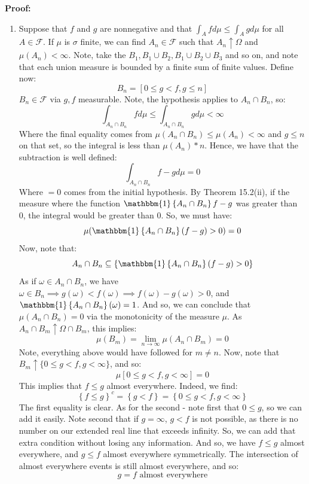 \documentclass[12pt,a4paper]{article}
\newcommand{\1}[1]{\mathbbm{1}\left\{ #1 \right\}}
\newcommand{\fcal}{\mathcal{F}}
\begin{document}
\textbf{Proof:} \begin{enumerate}
	\item Suppose that $f$ and $g$ are nonnegative and that $\int_A f d\mu \leq \int_A g d\mu$ for all $A \in \fcal$. If $\mu$ is $\sigma$ finite, we can find $A_n \in \fcal$ such that $A_n \uparrow \Omega$ and $\mu(A_n) < \infty$. Note, take the $B_1, B_1 \cup B_2, B_1 \cup B_2 \cup B_3$ and so on, and note that each union measure is bounded by a finite sum of finite values. Define now:
	$$
		B_n = \left[0 \leq g < f, g \leq n\right]
	$$
	$B_n \in \fcal$ via $g, f$ measurable. Note, the hypothesis applies to $A_n \cap B_n$, so:
	$$
		\int_{A_n \cap B_n} f d\mu \leq \int_{A_n \cap B_n} g d\mu < \infty
	$$
	Where the final equality comes from $\mu(A_n \cap B_n) \leq \mu(A_n) < \infty$ and $g \leq n$ on that set, so the integral is less than $\mu(A_n) * n$. Hence, we have that the subtraction is well defined:
	$$
		\int_{A_n \cap B_n} f - g d\mu = 0
	$$
	Where $= 0$ comes from the initial hypothesis. By Theorem 15.2(ii), if the measure where the function $\1{A_n \cap B_n} f - g$ was greater than 0, the integral would be greater than 0. So, we must have:
	$$
		\mu(\1{A_n \cap B_n}(f - g) > 0) = 0
	$$
	Now, note that:
	$$
		A_n \cap B_n \subseteq \left\{\1{A_n \cap B_n}(f - g) > 0\right\}
	$$
	As if $\omega \in A_n \cap B_n$, we have $\omega \in B_n \implies g(\omega) < f(\omega) \implies f(\omega) - g(\omega) > 0$, and $\1{A_n \cap B_n}(\omega) = 1$. And so, we can conclude that $\mu(A_n \cap B_n) = 0$ via the monotonicity of the measure $\mu$. As $A_n \cap B_m \uparrow \Omega \cap B_m$, this implies:
	$$
		\mu(B_m) = \lim_{n \to \infty} \mu(A_n \cap B_m) = 0
	$$
	Note, everything above would have followed for $m \neq n$. Now, note that $B_m \uparrow \{0 \leq g < f, g < \infty\}$, and so:
	$$
		\mu\left[0 \leq g < f, g < \infty\right] = 0
	$$
	This implies that $f \leq g$ almost everywhere. Indeed, we find:
	$$
		\left\{f \leq g\right\}^c = \left\{g < f\right\} =
		\left\{0 \leq g < f, g < \infty\right\}
	$$
	The first equality is clear. As for the second - note first that $0 \leq g$, so we can add it easily. Note second that if $g = \infty$, $g < f$ is not possible, as there is no number on our extended real line that exceeds infinity. So, we can add that extra condition without losing any information. And so, we have $f \leq g$ almost everywhere, and $g \leq f$ almost everywhere symmetrically. The intersection of almost everywhere events is still almost everywhere, and so:
	$$
		g = f \text{ almost everywhere}
	$$
	

\end{enumerate}
\end{document}
